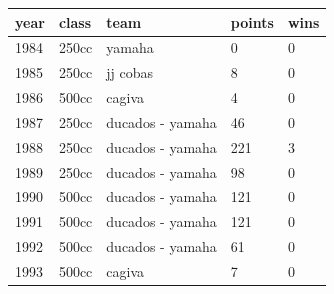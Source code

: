 \documentclass{article}
\begin{document}
\begin{tabular}{lllll}
\toprule
year & class & team & points & wins \\
\midrule
1984 & 250cc & yamaha & 0 & 0 \\
1985 & 250cc & jj cobas & 8 & 0 \\
1986 & 500cc & cagiva & 4 & 0 \\
1987 & 250cc & ducados - yamaha & 46 & 0 \\
1988 & 250cc & ducados - yamaha & 221 & 3 \\
1989 & 250cc & ducados - yamaha & 98 & 0 \\
1990 & 500cc & ducados - yamaha & 121 & 0 \\
1991 & 500cc & ducados - yamaha & 121 & 0 \\
1992 & 500cc & ducados - yamaha & 61 & 0 \\
1993 & 500cc & cagiva & 7 & 0 \\
\bottomrule
\end{tabular}
\end{document}
